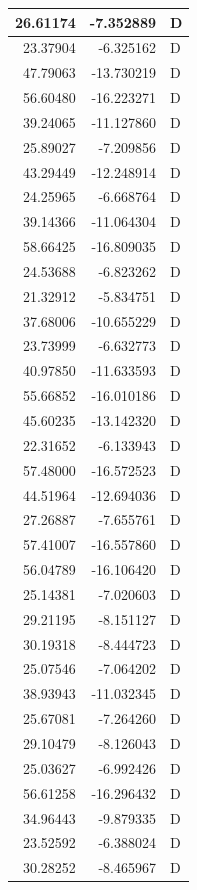 \documentclass[
  letterpaper,
  DIV=11,
  numbers=noendperiod]{scrartcl}
\begin{document}
\begin{table}
\begin{tabular}[t]{r|r|l}
\hline
26.61174 & -7.352889 & D\\
\hline
23.37904 & -6.325162 & D\\
\hline
47.79063 & -13.730219 & D\\
\hline
56.60480 & -16.223271 & D\\
\hline
39.24065 & -11.127860 & D\\
\hline
25.89027 & -7.209856 & D\\
\hline
43.29449 & -12.248914 & D\\
\hline
24.25965 & -6.668764 & D\\
\hline
39.14366 & -11.064304 & D\\
\hline
58.66425 & -16.809035 & D\\
\hline
24.53688 & -6.823262 & D\\
\hline
21.32912 & -5.834751 & D\\
\hline
37.68006 & -10.655229 & D\\
\hline
23.73999 & -6.632773 & D\\
\hline
40.97850 & -11.633593 & D\\
\hline
55.66852 & -16.010186 & D\\
\hline
45.60235 & -13.142320 & D\\
\hline
22.31652 & -6.133943 & D\\
\hline
57.48000 & -16.572523 & D\\
\hline
44.51964 & -12.694036 & D\\
\hline
27.26887 & -7.655761 & D\\
\hline
57.41007 & -16.557860 & D\\
\hline
56.04789 & -16.106420 & D\\
\hline
25.14381 & -7.020603 & D\\
\hline
29.21195 & -8.151127 & D\\
\hline
30.19318 & -8.444723 & D\\
\hline
25.07546 & -7.064202 & D\\
\hline
38.93943 & -11.032345 & D\\
\hline
25.67081 & -7.264260 & D\\
\hline
29.10479 & -8.126043 & D\\
\hline
25.03627 & -6.992426 & D\\
\hline
56.61258 & -16.296432 & D\\
\hline
34.96443 & -9.879335 & D\\
\hline
23.52592 & -6.388024 & D\\
\hline
30.28252 & -8.465967 & D\\

\end{tabular}
\end{table}
\end{document}
